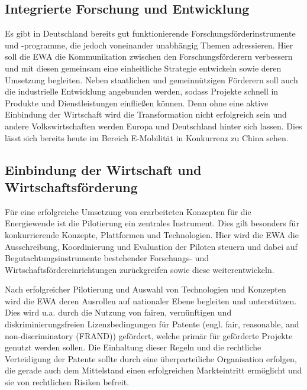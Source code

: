 \subsection{Integrierte Forschung und Entwicklung}

Es gibt in Deutschland bereits gut funktionierende Forschungsförderinstrumente und -programme, die jedoch voneinander unabhängig Themen adressieren.
Hier soll die EWA die Kommunikation zwischen den Forschungsförderern verbessern und mit diesen gemeinsam eine einheitliche Strategie entwickeln sowie deren Umsetzung begleiten.
Neben staatlichen und gemeinnützigen Förderern soll auch die industrielle Entwicklung angebunden werden, sodass Projekte schnell in Produkte und Dienstleistungen einfließen können.
Denn ohne eine aktive Einbindung der Wirtschaft wird die Transformation nicht erfolgreich sein und andere Volkswirtschaften werden Europa und Deutschland hinter sich lassen.
Dies lässt sich bereits heute im Bereich E-Mobilität in Konkurrenz zu China sehen.

\subsection{Einbindung der Wirtschaft und Wirtschaftsförderung}

Für eine erfolgreiche Umsetzung von erarbeiteten Konzepten für die Energiewende ist die Pilotierung ein zentrales Instrument.
Dies gilt besonders für konkurrierende Konzepte, Plattformen und Technologien.
Hier wird die EWA die Ausschreibung, Koordinierung und Evaluation der Piloten steuern und dabei auf Begutachtungsinstrumente bestehender Forschungs- und Wirtschaftsfördereinrichtungen zurückgreifen sowie diese weiterentwickeln.

Nach erfolgreicher Pilotierung und Auswahl von Technologien und Konzepten wird die EWA deren Ausrollen auf nationaler Ebene begleiten und unterstützen.
Dies wird u.a. durch die Nutzung von fairen, vernünftigen und diskriminierungsfreien Lizenzbedingungen für Patente (engl. fair, reasonable, and non-discriminatory (FRAND)) gefördert, welche primär für geförderte Projekte genutzt werden sollen.
Die Einhaltung dieser Regeln und die rechtliche Verteidigung der Patente sollte durch eine überparteiliche Organisation erfolgen, die gerade auch dem Mittelstand einen erfolgreichen Markteintritt ermöglicht und sie von rechtlichen Risiken befreit.

